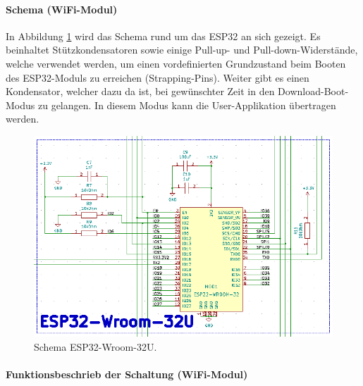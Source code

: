 \paragraph{Schema (WiFi-Modul)}\mbox{}

In Abbildung \ref{fig:Schema_ESP32} wird das Schema rund um das ESP32 an sich gezeigt. Es beinhaltet Stützkondensatoren sowie einige Pull-up- und Pull-down-Widerstände, welche verwendet werden, um einen vordefinierten Grundzustand beim Booten des ESP32-Moduls zu erreichen (Strapping-Pins). Weiter gibt es einen Kondensator, welcher dazu da ist, bei gewünschter Zeit in den Download-Boot-Modus zu gelangen. In diesem Modus kann die User-Applikation übertragen werden.

\begin{figure}[h!]
	\centering
	\includegraphics[width=\textwidth]{graphics/Schema_ESP32}
	\caption{Schema ESP32-Wroom-32U.}
	\label{fig:Schema_ESP32}
\end{figure}

\paragraph{Funktionsbeschrieb der Schaltung (WiFi-Modul)}\mbox{}


